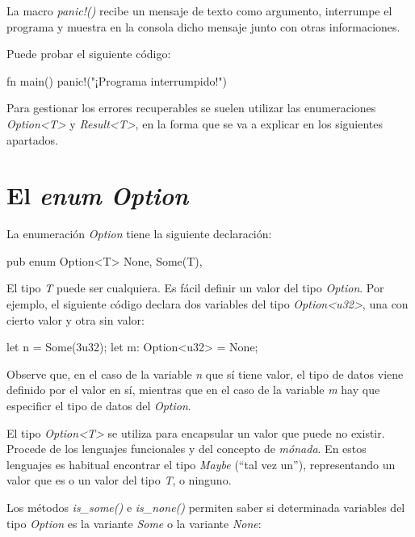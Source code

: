 La macro \textit{panic!()} recibe un mensaje de texto como argumento, interrumpe el programa y muestra en la consola dicho mensaje junto con otras informaciones. 

Puede probar el siguiente código:

\vspace{0.7em}
\begin{Codigo}
   fn main() {
      panic!("¡Programa interrumpido!")
   }
\end{Codigo}

Para gestionar los errores recuperables se suelen utilizar las enumeraciones \textit{Option<T>} y \textit{Result<T>}, en la forma que se va a explicar en los siguientes apartados.

\section{El \textit{enum Option}}
\noindent La enumeración \textit{Option} tiene la siguiente declaración:

\vspace{0.7em}
\begin{Codigo}
   pub enum Option<T> {
      None,
      Some(T),
   }
\end{Codigo}

\vspace{1em}
El tipo \textit{T} puede ser cualquiera. Es fácil definir un valor del tipo \textit{Option}. Por ejemplo, el siguiente código declara dos variables del tipo \textit{Option<u32>}, una con cierto valor y otra sin valor:

\vspace{0.7em}
\begin{Codigo}
   let n = Some(3u32);
   let m: Option<u32> = None; 
\end{Codigo}

Observe que, en el caso de la variable \textit{n} que sí tiene valor, el tipo de datos viene definido por el valor en sí, mientras que en el caso de la variable \textit{m} hay que especificr el tipo de datos del \textit{Option}.

El tipo \textit{Option<T>} se utiliza para encapsular un valor que puede no existir. Procede de los lenguajes funcionales y del concepto de \textit{mónada}. En estos lenguajes es habitual encontrar el tipo  \textit{Maybe} (``tal vez un''), representando un valor que es o un valor del tipo \textit{T}, o ninguno.

Los métodos \textit{is\_some()} e \textit{is\_none()} permiten saber si determinada variables del tipo \textit{Option} es la variante \textit{Some} o la variante \textit{None}:


